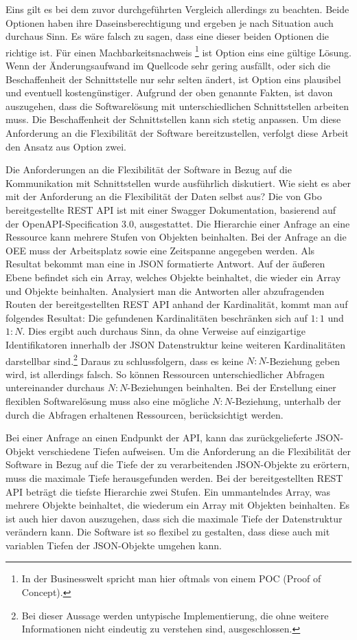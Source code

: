 Eins gilt es bei dem zuvor durchgeführten Vergleich allerdings zu beachten. Beide Optionen haben ihre Daseinsberechtigung
und ergeben je nach Situation auch durchaus Sinn. Es wäre falsch zu sagen, dass eine dieser beiden Optionen die richtige ist. Für einen
Machbarkeitsnachweis \footnote{In der Businesswelt spricht man hier oftmals von einem POC (Proof of Concept).}
ist Option eins eine gültige Lösung. Wenn der Änderungsaufwand im Quellcode sehr gering ausfällt, oder sich
die Beschaffenheit der Schnittstelle nur sehr selten ändert, ist Option eins plausibel und eventuell kostengünstiger.
Aufgrund der oben genannte Fakten, ist davon auszugehen, dass die Softwarelösung mit unterschiedlichen Schnittstellen arbeiten muss.
Die Beschaffenheit der Schnittstellen kann sich stetig anpassen. Um diese Anforderung an die Flexibilität
der Software bereitzustellen, verfolgt diese Arbeit den Ansatz aus Option zwei.

Die Anforderungen an die Flexibilität der Software in Bezug auf die Kommunikation mit Schnittstellen wurde
ausführlich diskutiert. Wie sieht es aber mit der Anforderung an die Flexibilität der Daten selbst aus?
Die von Gbo bereitgestellte REST API ist mit einer Swagger Dokumentation, basierend auf der
OpenAPI-Specification 3.0, ausgestattet. Die Hierarchie einer Anfrage an eine Ressource kann mehrere Stufen von Objekten beinhalten.
Bei der Anfrage an die OEE muss der Arbeitsplatz sowie eine Zeitspanne angegeben werden. Als Resultat bekommt man eine 
in JSON formatierte Antwort. Auf der äußeren Ebene befindet sich ein Array, welches Objekte beinhaltet, die wieder ein
Array und Objekte beinhalten. Analysiert man die Antworten aller abzufragenden Routen der bereitgestellten REST API anhand der Kardinalität,
kommt man auf folgendes Resultat: Die gefundenen Kardinalitäten beschränken sich auf \(1:1\) und \(1:N\). Dies ergibt auch
durchaus Sinn, da ohne Verweise auf einzigartige Identifikatoren innerhalb der JSON Datenstruktur keine weiteren
Kardinalitäten darstellbar sind.\footnote{Bei dieser Aussage werden untypische Implementierung,
die ohne weitere Informationen nicht eindeutig zu verstehen sind, ausgeschlossen.}
Daraus zu schlussfolgern, dass es keine \(N:N\)-Beziehung geben wird, ist allerdings falsch.
So können Ressourcen unterschiedlicher Abfragen untereinander durchaus \(N:N\)-Beziehungen beinhalten. Bei der Erstellung
einer flexiblen Softwarelösung muss also eine mögliche \(N:N\)-Beziehung, unterhalb der durch die Abfragen erhaltenen
Ressourcen, berücksichtigt werden.

Bei einer Anfrage an einen Endpunkt der API, kann das zurückgelieferte JSON-Objekt verschiedene Tiefen aufweisen. 
Um die Anforderung an die Flexibilität der Software in Bezug auf die Tiefe der zu verarbeitenden JSON-Objekte zu
erörtern, muss die maximale Tiefe herausgefunden werden. Bei der bereitgestellten REST API beträgt die tiefste
Hierarchie zwei Stufen. Ein ummantelndes Array, was mehrere Objekte beinhaltet, die wiederum ein Array mit Objekten
beinhalten. Es ist auch hier davon auszugehen, dass sich die maximale Tiefe der Datenstruktur verändern kann.
Die Software ist so flexibel zu gestalten, dass diese auch mit variablen Tiefen der JSON-Objekte umgehen kann.

